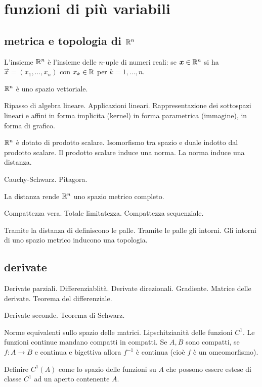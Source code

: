 \chapter{funzioni di più variabili}

\section{metrica e topologia di ${\mathbb R}^n$}

L'insieme ${\mathbb R}^n$ è l'insieme delle $n$-uple di 
numeri reali: se $\boldsymbol x \in {\mathbb R}^n$ si ha $\vec x=(x_1,\dots,x_n)$ 
con $x_k\in {\mathbb R}$ per $k=1,\dots,n$.

${\mathbb R}^n$ è uno spazio vettoriale.

Ripasso di algebra lineare. Applicazioni lineari. 
Rappresentazione dei sottospazi lineari e affini in forma implicita (kernel)
in forma parametrica (immagine), in forma di grafico.

${\mathbb R}^n$ è dotato di prodotto scalare. 
Isomorfismo tra spazio e duale indotto dal prodotto scalare.
Il prodotto scalare induce una norma.
La norma induce una distanza.

Cauchy-Schwarz. Pitagora. 

La distanza rende ${\mathbb R}^n$ uno spazio metrico 
completo.

Compattezza vera. Totale limitatezza. Compattezza sequenziale.

\begin{definition}
\end{definition}

\begin{definition}[completezza]
\end{definition}

Tramite la distanza di definiscono le palle. 
Tramite le palle gli intorni.
Gli intorni di uno spazio metrico inducono una 
topologia.

\section{derivate}

Derivate parziali. 
Differenziablità.
Derivate direzionali.
Gradiente. 
Matrice delle derivate.
Teorema del differenziale.

Derivate seconde.
Teorema di Schwarz.

Norme equivalenti sullo spazio delle matrici. Lipschitzianità delle funzioni $C^1$.
Le funzioni continue mandano compatti in compatti.
Se $A,B$ sono compatti, se $f\colon A\to B$ e continua e bigettiva allora 
$f^{-1}$ è continua (cioè $f$ è un omeomorfismo).

Definire $C^1(A)$ come lo spazio delle funzioni su $A$ che possono essere 
estese di classe $C^1$ ad un aperto contenente $A$.

